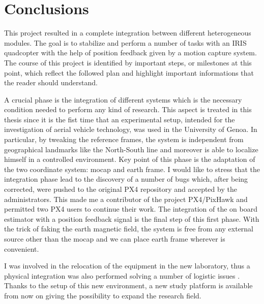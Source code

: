 \def\baselinestretch{1}
\chapter{Conclusions}
\label{chap:conclusions}
\ifpdf
    \graphicspath{{Conclusions/Figures/PNG/}{Conclusions/Figures/PDF/}{Conclusions/Figures/}}
\else
    \graphicspath{{Conclusions/Figures/EPS/}{Conclusions/Figures/}}
\fi
\def\baselinestretch{1.66}

This project resulted in a complete integration between different heterogeneous modules. The goal is to stabilize and perform a number of tasks with an IRIS quadcopter with the help of position feedback given by a motion capture system. The course of this project is identified by important steps, or milestones at this point, which reflect the followed plan and highlight important informations that the reader should understand. 

A crucial phase is the integration of different systems which is the necessary condition needed to perform any kind of research. This aspect is treated in this thesis since it is the fist time that an experimental setup, intended for the investigation of aerial vehicle technology, was used in the University of Genoa. In particular, by tweaking the reference frames, the system is independent from geographical landmarks like the North-South line and moreover is able to localize himself in a controlled environment. Key point of this phase is the adaptation of the two coordinate system: mocap and earth frame. I would like to stress that the integration phase lead to the discovery of a number of bugs which, after being corrected, were pushed to the original PX4 repository and accepted by the administrators. This made me a contributor of the project PX4/PixHawk and permitted two PX4 users to continue their work. The integration of the on board estimator with a position feedback signal is the final step of this first phase. With the trick of faking the earth magnetic field, the system is free from any external source other than the mocap and we can place earth frame wherever is convenient.

I was involved in the relocation of the equipment in the new laboratory, thus a physical integration was also performed solving a number of logistic issues . Thanks to the setup of this new environment, a new study platform is available from now on giving the possibility to expand the research field.

